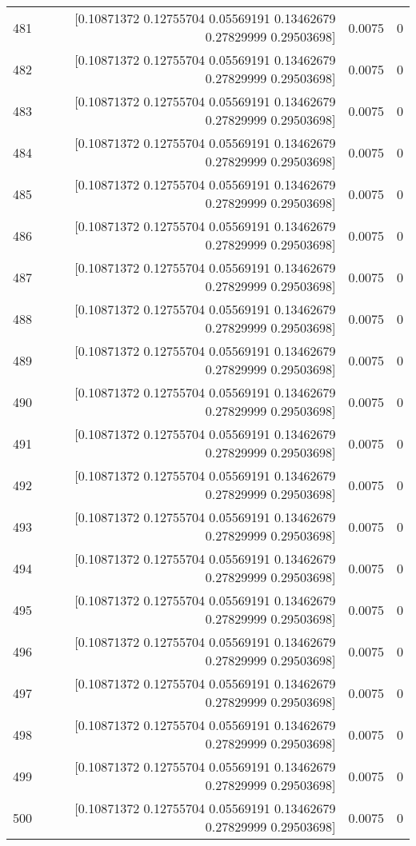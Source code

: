 \begin{longtable}{lrrr}
481 & [0.10871372 0.12755704 0.05569191 0.13462679 0.27829999 0.29503698] & 0.0075 & 0 \\
482 & [0.10871372 0.12755704 0.05569191 0.13462679 0.27829999 0.29503698] & 0.0075 & 0 \\
483 & [0.10871372 0.12755704 0.05569191 0.13462679 0.27829999 0.29503698] & 0.0075 & 0 \\
484 & [0.10871372 0.12755704 0.05569191 0.13462679 0.27829999 0.29503698] & 0.0075 & 0 \\
485 & [0.10871372 0.12755704 0.05569191 0.13462679 0.27829999 0.29503698] & 0.0075 & 0 \\
486 & [0.10871372 0.12755704 0.05569191 0.13462679 0.27829999 0.29503698] & 0.0075 & 0 \\
487 & [0.10871372 0.12755704 0.05569191 0.13462679 0.27829999 0.29503698] & 0.0075 & 0 \\
488 & [0.10871372 0.12755704 0.05569191 0.13462679 0.27829999 0.29503698] & 0.0075 & 0 \\
489 & [0.10871372 0.12755704 0.05569191 0.13462679 0.27829999 0.29503698] & 0.0075 & 0 \\
490 & [0.10871372 0.12755704 0.05569191 0.13462679 0.27829999 0.29503698] & 0.0075 & 0 \\
491 & [0.10871372 0.12755704 0.05569191 0.13462679 0.27829999 0.29503698] & 0.0075 & 0 \\
492 & [0.10871372 0.12755704 0.05569191 0.13462679 0.27829999 0.29503698] & 0.0075 & 0 \\
493 & [0.10871372 0.12755704 0.05569191 0.13462679 0.27829999 0.29503698] & 0.0075 & 0 \\
494 & [0.10871372 0.12755704 0.05569191 0.13462679 0.27829999 0.29503698] & 0.0075 & 0 \\
495 & [0.10871372 0.12755704 0.05569191 0.13462679 0.27829999 0.29503698] & 0.0075 & 0 \\
496 & [0.10871372 0.12755704 0.05569191 0.13462679 0.27829999 0.29503698] & 0.0075 & 0 \\
497 & [0.10871372 0.12755704 0.05569191 0.13462679 0.27829999 0.29503698] & 0.0075 & 0 \\
498 & [0.10871372 0.12755704 0.05569191 0.13462679 0.27829999 0.29503698] & 0.0075 & 0 \\
499 & [0.10871372 0.12755704 0.05569191 0.13462679 0.27829999 0.29503698] & 0.0075 & 0 \\
500 & [0.10871372 0.12755704 0.05569191 0.13462679 0.27829999 0.29503698] & 0.0075 & 0 \\
\end{longtable}